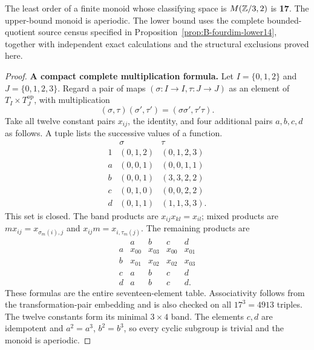 \begin{theorem}
\label{B:Moore3-minimum17}
The least order of a finite monoid whose classifying space is
$M(\mathbb Z/3,2)$ is \textbf{17}. The upper-bound monoid is aperiodic.
The lower bound uses the complete bounded-quotient source census
specified in Proposition~\ref{prop:B-fourdim-lower14}, together
with independent exact calculations and the structural exclusions
proved here.
\end{theorem}
\begin{proof}
\textbf{A compact complete multiplication formula.}
Let $I=\{0,1,2\}$ and $J=\{0,1,2,3\}$. Regard a pair of maps
$(\sigma:I\to I,\tau:J\to J)$ as an element of
$T_I\times T_J^{\mathrm{op}}$, with multiplication
\[
 (\sigma,\tau)(\sigma',\tau')
       =(\sigma\sigma',\tau'\tau).
\]
Take all twelve constant pairs $x_{ij}$, the identity, and four
additional pairs $a,b,c,d$ as follows. A tuple lists the successive
values of a function.
\[
\begin{array}{c|c|c}
 &\sigma&\tau\\\hline
1&(0,1,2)&(0,1,2,3)\\
a&(0,0,1)&(0,0,1,1)\\
b&(0,0,1)&(3,3,2,2)\\
c&(0,1,0)&(0,0,2,2)\\
d&(0,1,1)&(1,1,3,3).
\end{array}
\]
This set is closed. The band products are
$x_{ij}x_{kl}=x_{il}$; mixed products are
$m x_{ij}=x_{\sigma_m(i),j}$ and
$x_{ij}m=x_{i,\tau_m(j)}$. The remaining products are
\[
\begin{array}{c|cccc}
 &a&b&c&d\\\hline
a&x_{00}&x_{03}&x_{00}&x_{01}\\
b&x_{01}&x_{02}&x_{02}&x_{03}\\
c&a&b&c&d\\
d&a&b&c&d.
\end{array}
\]
These formulas are the entire seventeen-element table.
Associativity follows from the transformation-pair embedding and
is also checked on all $17^3=4913$ triples. The twelve constants
form its minimal $3\times4$ band. The elements $c,d$ are
idempotent and $a^2=a^3$, $b^2=b^3$, so every cyclic subgroup is
trivial and the monoid is aperiodic.


\end{proof}
